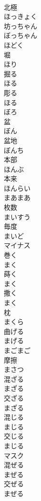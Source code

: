\documentclass[8pt]{extreport}
\begin{document}
\begin{CJK}{UTF8}{min}
\\	北極 
\\	ほっきょく	
\\	坊っちゃん 
\\	ぼっちゃん	
\\	ほどく	
\\	堀 
\\	ほり	
\\	掘る 
\\	ほる	
\\	彫る 
\\	ほる	
\\	ぼろ	
\\	盆 
\\	ぼん	
\\	盆地 
\\	ぼんち	
\\	本部 
\\	ほんぶ	
\\	本来 
\\	ほんらい	
\\	まあまあ	
\\	枚数 
\\	まいすう	
\\	毎度 
\\	まいど	
\\	マイナス	
\\	巻く 
\\	まく	
\\	蒔く 
\\	まく	
\\	撒く 
\\	まく	
\\	枕 
\\	まくら	
\\	曲げる 
\\	まげる	
\\	まごまご	
\\	摩擦 
\\	まさつ	
\\	混ざる 
\\	まざる	
\\	交ざる 
\\	まざる	
\\	混じる 
\\	まじる	
\\	交じる 
\\	まじる	
\\	マスク	
\\	混ぜる 
\\	まぜる	
\\	交ぜる 
\\	まぜる	

\end{CJK}
\end{document}
